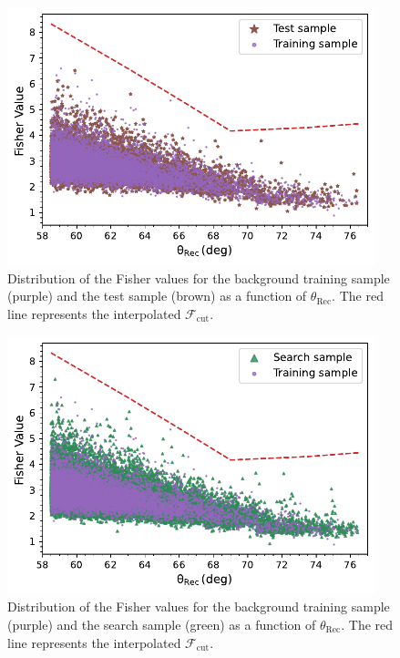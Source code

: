\begin{figure}[t!]
  \centering
  \includegraphics[width=0.95\textwidth]{thesis_figures/Nu_analysis/Fisher_plots/Fisher_comp_bkg_test_wnt.pdf}
  \caption{Distribution of the Fisher values for the background training sample (purple) and the test sample (brown) as a function of $\theta_{\text{Rec}}$. The red line represents the interpolated $\mathcal{F}_{\text{cut}}$.}
  \label{fig:Fish_bkg_test}
\end{figure}

\begin{figure}[t!]
  \centering
  \includegraphics[width=0.95\textwidth]{thesis_figures/Nu_analysis/Fisher_plots/Fisher_comp_bkg_search_wnt.pdf}
  \caption{Distribution of the Fisher values for the background training sample (purple) and the search sample (green) as a function of $\theta_{\text{Rec}}$. The red line represents the interpolated $\mathcal{F}_{\text{cut}}$.}
  \label{fig:Fish_bkg_search}
\end{figure}

